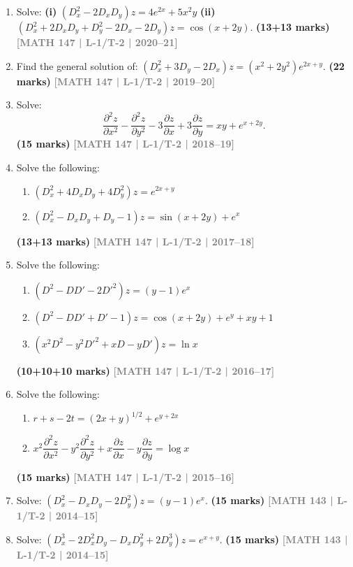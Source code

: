 \documentclass[12pt,a4paper]{article}
\newcommand{\yr}[1]{\hfill\textcolor{gray}{\small\textbf{[#1]}}}
\newcommand{\mk}[1]{\textcolor{orange!70!black}{\small\textbf{(#1 marks)}}}
\begin{document}
\begin{enumerate}
\item Solve: \textbf{(i)} $(D_{x}^{2}-2D_{x}D_{y})z=4e^{2x}+5x^{2}y$ \quad \textbf{(ii)} $(D_{x}^{2}+2D_{x}D_{y}+D_{y}^{2}-2D_{x}-2D_{y})z=\cos(x+2y)$.
\mk{13+13} \yr{MATH 147 | L-1/T-2 | 2020--21}

\item Find the general solution of: $(D_{x}^{2}+3D_{y}-2D_{x})z=(x^{2}+2y^{2})e^{2x+y}$.
\mk{22} \yr{MATH 147 | L-1/T-2 | 2019--20}

\item Solve:
\[
\frac{\partial^{2}z}{\partial x^{2}}-\frac{\partial^{2}z}{\partial y^{2}}-3\frac{\partial z}{\partial x}+3\frac{\partial z}{\partial y}=xy+e^{x+2y}.
\]
\mk{15} \yr{MATH 147 | L-1/T-2 | 2018--19}

\item Solve the following:
\begin{enumerate}
  \item $(D_{x}^{2}+4D_{x}D_{y}+4D_{y}^{2})z=e^{2x+y}$
  \item $(D_{x}^{2}-D_{x}D_{y}+D_{y}-1)z=\sin(x+2y)+e^{x}$
\end{enumerate}
\mk{13+13} \yr{MATH 147 | L-1/T-2 | 2017--18}

\item Solve the following:
\begin{enumerate}
  \item $(D^{2}-DD'-2D'^{2})z=(y-1)e^{x}$
  \item $(D^{2}-DD'+D'-1)z=\cos(x+2y)+e^{y}+xy+1$
  \item $(x^{2}D^{2}-y^{2}D'^{2}+xD-yD')z=\ln x$
\end{enumerate}
\mk{10+10+10} \yr{MATH 147 | L-1/T-2 | 2016--17}

\item Solve the following:
\begin{enumerate}
  \item $r+s-2t=(2x+y)^{1/2}+e^{y+2x}$ \quad [where $r=z_{xx},s=z_{xy},t=z_{yy}$]
  \item $x^{2}\dfrac{\partial^{2}z}{\partial x^{2}}-y^{2}\dfrac{\partial^{2}z}{\partial y^{2}}+x\dfrac{\partial z}{\partial x}-y\dfrac{\partial z}{\partial y}=\log x$
\end{enumerate}
\mk{15} \yr{MATH 147 | L-1/T-2 | 2015--16}

\item Solve: $(D_{x}^{2}-D_{x}D_{y}-2D_{y}^{2})z=(y-1)e^{x}$.
\mk{15} \yr{MATH 143 | L-1/T-2 | 2014--15}

\item Solve: $(D_{x}^{3}-2D_{x}^{2}D_{y}-D_{x}D_{y}^{2}+2D_{y}^{3})z=e^{x+y}$.
\mk{15} \yr{MATH 143 | L-1/T-2 | 2014--15}


\end{enumerate}
\end{document}
